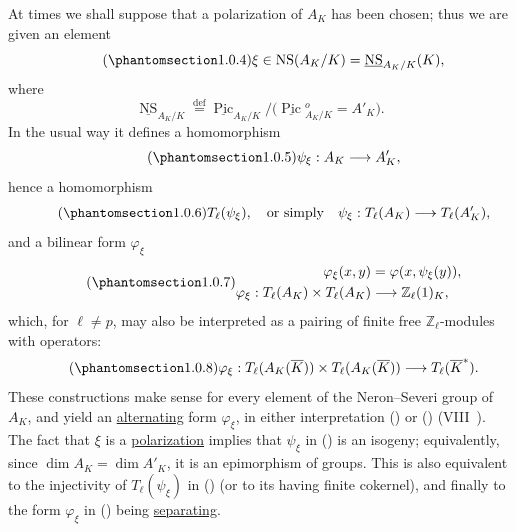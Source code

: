 At times we shall suppose that a polarization of $A_K$ has been chosen;
thus we are given an element
\begin{equation}\tag{\SGARefTarget{sga7.sga7i.eix.n1-0-4}{1.0.4}}
 \xi\in\operatorname{NS}(A_K/K)
 =\underline{\operatorname{NS}}_{A_K/K}(K),
\end{equation}
where
\[
 \underline{\operatorname{NS}}_{A_K/K}
 \overset{\mathrm{def}}{=}
 \underline{\operatorname{Pic}}_{A_K/K}/
 \bigl(\underline{\operatorname{Pic}}{}^o_{A_K/K}=A'_K\bigr).
\]
In the usual way it defines a homomorphism
\begin{equation}\tag{\SGARefTarget{sga7.sga7i.eix.n1-0-5}{1.0.5}}
 \psi_\xi:A_K\longrightarrow A'_K,
\end{equation}
hence a homomorphism
\begin{equation}\tag{\SGARefTarget{sga7.sga7i.eix.n1-0-6}{1.0.6}}
 T_\ell(\psi_\xi),\quad\text{or simply}\quad
 \psi_\xi:T_\ell(A_K)\longrightarrow T_\ell(A'_K),
\end{equation}
and a bilinear form $\varphi_\xi$
\begin{equation}\tag{\SGARefTarget{sga7.sga7i.eix.n1-0-7}{1.0.7}}
 \begin{split}
 \varphi_\xi(x,y)&=\varphi(x,\psi_\xi(y)),\\
 \varphi_\xi:T_\ell(A_K)\times T_\ell(A_K)
 &\longrightarrow\mathbb Z_\ell(1)_K,
 \end{split}
\end{equation}
which, for $\ell\ne p$, may also be interpreted as a pairing of
finite free $\mathbb Z_\ell$-modules with operators:
\begin{equation}\tag{\SGARefTarget{sga7.sga7i.eix.n1-0-8}{1.0.8}}
 \varphi_\xi:T_\ell(A_K(\overline K))\times
 T_\ell(A_K(\overline K))\longrightarrow T_\ell(\overline K^*).
\end{equation}
These constructions make sense for every element of the
Neron--Severi group of $A_K$, and yield an \underline{alternating} form
$\varphi_\xi$, in either interpretation () or ()
(VIII~).  The fact that $\xi$ is a \underline{polarization}
implies that $\psi_\xi$ in () is an isogeny; equivalently, since
$\dim A_K=\dim A'_K$, it is an epimorphism of groups.  This is also
equivalent to the injectivity of $T_\ell(\psi_\xi)$ in () (or to
its having finite cokernel), and finally to the form $\varphi_\xi$ in
() being \underline{separating}.

